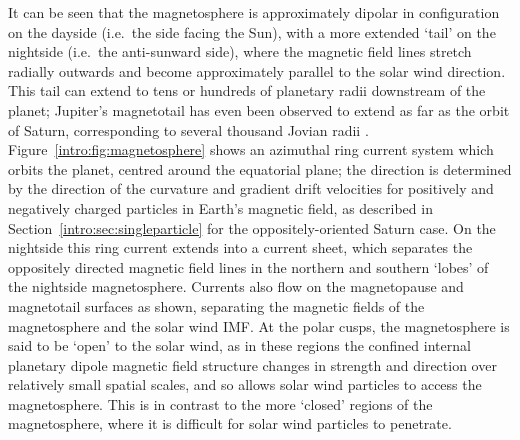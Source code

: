 It can be seen that the magnetosphere is approximately dipolar in configuration on the dayside (i.e.\ the side facing the Sun), with a more extended `tail' on the nightside (i.e.\ the anti-sunward side), where the magnetic field lines stretch radially outwards and become approximately parallel to the solar wind direction. This tail can extend to tens or hundreds of planetary radii downstream of the planet; Jupiter's magnetotail has even been observed to extend as far as the orbit of Saturn, corresponding to several thousand Jovian radii \citep{scarf1981}. Figure~\ref{intro:fig:magnetosphere} shows an azimuthal ring current system which orbits the planet, centred around the equatorial plane; the direction is determined by the direction of the curvature and gradient drift velocities for positively and negatively charged particles in Earth's magnetic field, as described in Section~\ref{intro:sec:singleparticle} for the oppositely-oriented Saturn case. On the nightside this ring current extends into a current sheet, which separates the oppositely directed magnetic field lines in the northern and southern `lobes' of the nightside magnetosphere. Currents also flow on the magnetopause and magnetotail surfaces as shown, separating the magnetic fields of the magnetosphere and the solar wind IMF. At the polar cusps, the magnetosphere is said to be `open' to the solar wind, as in these regions the confined internal planetary dipole magnetic field structure changes in strength and direction over relatively small spatial scales, and so allows solar wind particles to access the magnetosphere. This is in contrast to the more `closed' regions of the magnetosphere, where it is difficult for solar wind particles to penetrate.

